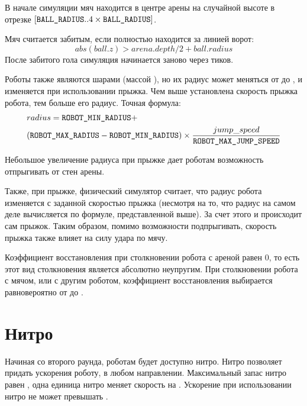 В начале симуляции мяч находится в центре арены на случайной высоте в отрезке
$[\texttt{BALL\_RADIUS} .. 4\times\texttt{BALL\_RADIUS}]$.

Мяч считается забитым, если полностью находится за линией ворот:
\begin{equation}
      abs(ball.z)>arena.depth/2+ball.radius
\end{equation}
После забитого гола симуляция начинается заново через  тиков.

Роботы также являются шарами (массой ), но их радиус может меняться от
 до ,
и изменяется при использовании прыжка.
Чем выше установлена скорость прыжка робота, тем больше его радиус.
Точная формула:
\begin{equation}
	\begin{split}
		&radius=\texttt{ROBOT\_MIN\_RADIUS}+\\
		&(\texttt{ROBOT\_MAX\_RADIUS}-\texttt{ROBOT\_MIN\_RADIUS})\times\frac{jump\_speed}{\texttt{ROBOT\_MAX\_JUMP\_SPEED}}
	\end{split}
\end{equation}

Небольшое увеличение радиуса при прыжке дает роботам возможность отпрыгивать от стен арены.

Также, при прыжке, физический симулятор считает, что радиус робота изменяется с заданной скоростью прыжка
(несмотря на то, что радиус на самом деле вычисляется по формуле, представленной выше).
За счет этого и происходит сам прыжок.
Таким образом, помимо возможности подпрыгивать, скорость прыжка также влияет на силу удара по мячу.

Коэффициент восстановления при столкновении робота с ареной равен $0$,
то есть этот вид столкновения является абсолютно неупругим.
При столкновении робота с мячом, или с другим роботом,
коэффициент восстановления выбирается равновероятно от  до .

\section{Нитро}

Начиная со второго раунда, роботам будет доступно нитро.
Нитро позволяет придать ускорения роботу, в любом направлении.
Максимальный запас нитро равен , одна единица нитро меняет скорость на .
Ускорение при использовании нитро не может превышать .

